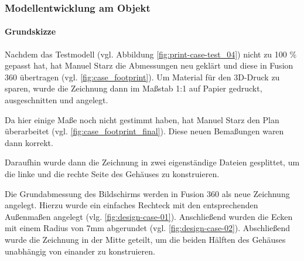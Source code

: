 \subsubsection{Modellentwicklung am Objekt}\label{hw_case_modellentwicklung}
\paragraph{Grundskizze}
Nachdem das Testmodell (vgl. Abbildung \ref{fig:print-case-test_04}) nicht zu 100 \% gepasst hat, hat Manuel Starz die Abmessungen neu geklärt und diese in Fusion 360 übertragen (vgl. \ref{fig:case_footprint}). 
Um Material für den 3D-Druck zu sparen, wurde die Zeichnung dann im Maßstab 1:1 auf Papier gedruckt, ausgeschnitten und angelegt.\par
\noindent Da hier einige Maße noch nicht gestimmt haben, hat Manuel Starz den Plan überarbeitet (vgl. \ref{fig:case_footprint_final}). 
Diese neuen Bemaßungen waren dann korrekt.\par
\noindent Daraufhin wurde dann die Zeichnung in zwei eigenständige Dateien gesplittet, um die linke und die rechte Seite des Gehäuses zu konstruieren.\par
\noindent Die Grundabmessung des Bildschirms werden in Fusion 360 als neue Zeichnung angelegt. 
Hierzu wurde ein einfaches Rechteck mit den entsprechenden Außenmaßen angelegt (vlg. \ref{fig:design-case-01}). 
Anschließend wurden die Ecken mit einem Radius von 7mm abgerundet (vgl. \ref{fig:design-case-02}). 
Abschließend wurde die Zeichnung in der Mitte geteilt, um die beiden Hälften des Gehäuses unabhängig von einander zu konstruieren.\par
